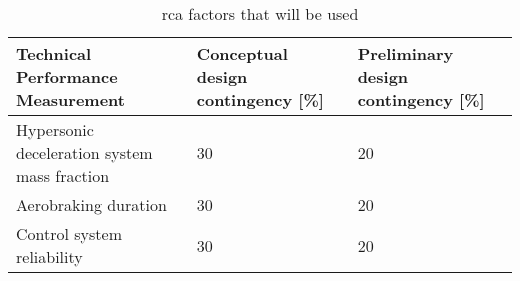 \begin{table}[h]
	\caption{\gls{rca} factors that will be used}
	\label{tab:tpm}
	\begin{tabular}{|p{}|p{}|p{}|}
		\hline
		\textbf{Technical Performance Measurement} & \textbf{Conceptual design contingency [\%]} & \textbf{Preliminary design contingency [\%]} \\ \hline
		Hypersonic deceleration system mass fraction & 30 & 20 \\ \hline
		Aerobraking duration & 30 & 20 \\ \hline
		Control system reliability & 30 & 20 \\ \hline
	\end{tabular}
\end{table}
